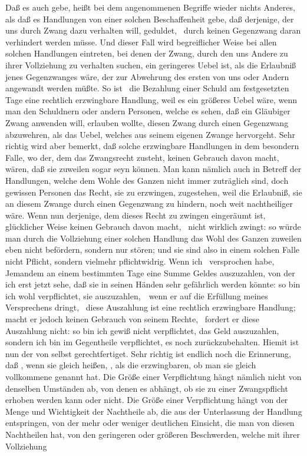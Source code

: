 \begin{aufza}
\item Daß es auch  gebe, heißt bei dem angenommenen Begriffe wieder nichts Anderes, als daß es Handlungen von einer solchen Beschaffenheit gebe, daß derjenige, der uns durch Zwang dazu verhalten will, geduldet, \di\ durch keinen Gegenzwang daran verhindert werden müsse. Und dieser Fall wird begreiflicher Weise bei allen solchen Handlungen eintreten, bei denen der Zwang, durch den uns Andere zu ihrer Vollziehung zu verhalten suchen, ein geringeres Uebel ist, als die Erlaubniß jenes Gegenzwanges wäre, der zur Abwehrung des ersten von uns oder Andern angewandt werden müßte. So ist \zB\  die Bezahlung einer Schuld am festgesetzten Tage eine rechtlich erzwingbare Handlung, weil es ein größeres Uebel wäre, wenn man den Schuldnern oder andern Personen, welche es sehen, daß ein Gläubiger Zwang anwenden will, erlauben wollte, diesen Zwang durch einen Gegenzwang abzuwehren, als das Uebel, welches aus seinem eigenen Zwange hervorgeht. Sehr richtig wird aber bemerkt, daß solche erzwingbare Handlungen in dem besondern Falle, wo der, dem das Zwangsrecht zusteht, keinen Gebrauch davon macht,  wären, daß sie zuweilen sogar  seyn können. Man kann nämlich auch in Betreff der Handlungen, welche dem Wohle des Ganzen nicht immer zuträglich sind, doch gewissen Personen das Recht, sie zu erzwingen, zugestehen, weil die Erlaubniß, sie an diesem Zwange durch einen Gegenzwang zu hindern, noch weit nachtheiliger wäre. Wenn nun derjenige, dem dieses Recht zu zwingen eingeräumt ist, glücklicher Weise keinen Gebrauch davon macht, \dh\  nicht wirklich zwingt: so würde man durch die Vollziehung einer solchen Handlung das Wohl des Ganzen zuweilen eben nicht befördern, sondern nur stören; und sie sind also in einem solchen Falle nicht Pflicht, sondern vielmehr pflichtwidrig. Wenn ich \zB\  versprochen habe, Jemandem an einem bestimmten Tage eine Summe Geldes auszuzahlen, von der ich erst jetzt sehe, daß sie in seinen Händen sehr gefährlich werden könnte: so bin ich wohl verpflichtet, sie auszuzahlen,~\ wenn er auf die Erfüllung meines Versprechens dringt, \dh\  diese Auszahlung ist eine rechtlich erzwingbare Handlung; macht er jedoch keinen Gebrauch von seinem Rechte, \dh\  fordert er diese Auszahlung nicht: so bin ich gewiß nicht verpflichtet, das Geld auszuzahlen, sondern ich bin im Gegentheile verpflichtet, es noch zurückzubehalten. Hiemit ist nun der  von selbst gerechtfertiget. Sehr richtig ist endlich noch die Erinnerung, daß , wenn sie gleich  heißen, , als die erzwingbaren, ob man sie gleich vollkommene genannt hat. Die Größe einer Verpflichtung hängt nämlich nicht von denselben Umständen ab, von denen es abhängt, ob sie zu einer Zwangspflicht erhoben werden kann oder nicht. Die Größe einer Verpflichtung hängt von der Menge und Wichtigkeit der Nachtheile ab, die aus der Unterlassung der Handlung entspringen, von der mehr oder weniger deutlichen Einsicht, die man von diesen Nachtheilen hat, von den geringeren oder größeren Beschwerden, welche mit ihrer Vollziehung 
\end{aufza}

